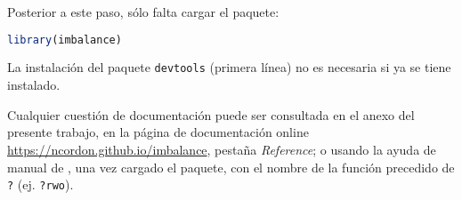 Posterior a este paso, sólo falta cargar el paquete:

\begin{lstlisting}[language=R,numbers=none]
library(imbalance)
\end{lstlisting}

La instalación del paquete \texttt{devtools} (primera línea) no es necesaria si ya se tiene instalado.

Cualquier cuestión de documentación puede ser consultada en el anexo del presente trabajo, en la página
de documentación online \url{https://ncordon.github.io/imbalance}, pestaña \textit{Reference}; o usando la 
ayuda de manual de \R, una vez cargado el paquete, con el nombre de la función precedido de \texttt{?} (ej. \texttt{?rwo}).

